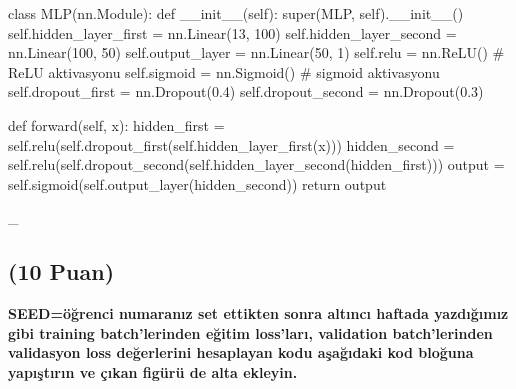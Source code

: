 \documentclass[11pt]{article}
\begin{document}
\begin{python}
class MLP(nn.Module):
    def __init__(self):
        super(MLP, self).__init__()
        self.hidden_layer_first = nn.Linear(13, 100)
        self.hidden_layer_second = nn.Linear(100, 50)
        self.output_layer = nn.Linear(50, 1)
        self.relu = nn.ReLU() # ReLU aktivasyonu
        self.sigmoid = nn.Sigmoid() # sigmoid aktivasyonu
        self.dropout_first = nn.Dropout(0.4)
        self.dropout_second = nn.Dropout(0.3)

    def forward(self, x):
        hidden_first = self.relu(self.dropout_first(self.hidden_layer_first(x)))
        hidden_second = self.relu(self.dropout_second(self.hidden_layer_second(hidden_first)))
        output = self.sigmoid(self.output_layer(hidden_second))
        return output
\end{python}
 _\\
\subsection{(10 Puan)} \textbf{SEED=öğrenci numaranız set ettikten sonra altıncı haftada yazdığımız gibi training batch'lerinden eğitim loss'ları, validation batch'lerinden validasyon loss değerlerini hesaplayan kodu aşağıdaki kod bloğuna yapıştırın ve çıkan figürü de alta ekleyin.}
\end{document}
